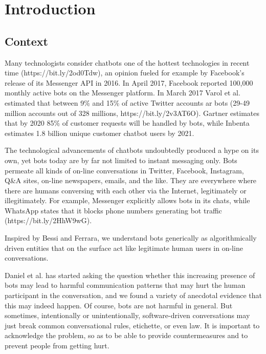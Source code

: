\chapter{Introduction}
\label{Introduction}
\thispagestyle{empty}


\section{Context}
Many technologists consider chatbots one of the hottest technologies in recent time (https://bit.ly/2od0Tdw), an opinion fueled for example by Facebook’s release of its Messenger API in 2016. In April 2017, Facebook reported 100,000 monthly active bots on the Messenger platform. In March 2017 Varol et al. \cite{Varol} estimated that between 9\% and 15\% of active Twitter accounts ar bots (29-49 million accounts out of 328 millions, https://bit.ly/2v3AT6O). Gartner estimates that by 2020 85\% of customer requests will be handled by bots, while Inbenta estimates 1.8 billion unique customer chatbot users by 2021. \cite{inbenta}

The technological advancements of chatbots undoubtedly produced a hype on its own, yet bots today are by far not limited to instant messaging only. Bots permeate all kinds of on-line conversations in Twitter, Facebook, Instagram, Q\&A sites, on-line newspapers, emails, and the like. They are everywhere where there are humans conversing with each other via the Internet, legitimately or illegitimately. For example, Messenger explicitly allows bots in its chats, while WhatsApp states that it blocks phone numbers generating bot traffic (https://bit.ly/2HhW9wG).

Inspired by Bessi and Ferrara, \cite{bessi} we understand bots generically as algorithmically driven entities that on the surface act like legitimate human users in on-line conversations.

Daniel et al. \cite{DanielIC2019} has started asking the question whether this increasing presence of bots may lead to harmful communication patterns that may hurt the human participant in the conversation, and we found a variety of anecdotal evidence that this may indeed happen. Of course, bots are not harmful in general. But sometimes, intentionally or unintentionally, software-driven conversations may just break common conversational rules, etichette, or even law. It is important to acknowledge the problem, so as to be able to provide countermeasures and to prevent people from getting hurt.

